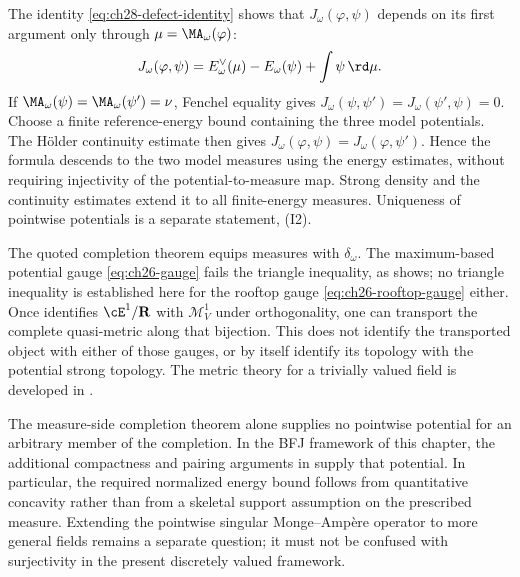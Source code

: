 \begin{remark}
\label{rem:ch28-quasimetric-well-defined}
The identity \eqref{eq:ch28-defect-identity} shows that
$J_\omega(\varphi,\psi)$ depends on its first argument only through
$\mu=\MA_\omega(\varphi)$:
\[
 J_\omega(\varphi,\psi)
   =E^\vee_\omega(\mu)-E_\omega(\psi)+\int\psi\,\rd\mu.
\]
If $\MA_\omega(\psi)=\MA_\omega(\psi')=\nu$, Fenchel equality gives
$J_\omega(\psi,\psi')=J_\omega(\psi',\psi)=0$.  Choose a finite
reference-energy bound containing the three model potentials.  The
H\"older continuity estimate
\cite[Theorem~1.33, equation~(1.38)]{BJ25FiniteEnergy} then gives
$J_\omega(\varphi,\psi)=J_\omega(\varphi,\psi')$.  Hence the formula
descends to the two model measures using the energy estimates, without
requiring injectivity of the potential-to-measure map.  Strong density
and the continuity estimates extend it to all finite-energy measures.
Uniqueness of pointwise potentials is a separate statement,
\textup{(I2)}.
\end{remark}

\begin{remark}
\label{rem:ch28-not-a-metric-on-potentials}
The quoted completion theorem equips measures with $\delta_\omega$.
The maximum-based potential gauge \eqref{eq:ch26-gauge} fails the
triangle inequality, as  shows; no triangle
inequality is established here for the rooftop gauge
\eqref{eq:ch26-rooftop-gauge} either.  Once
 identifies
$\cE^1/\mathbf R$ with $\mathcal M^1_V$ under orthogonality, one can
transport the complete quasi-metric along that bijection.  This does
not identify the transported object with either of those gauges, or
by itself identify its topology with the potential strong topology.
The metric theory for a trivially valued field is developed in
.
\end{remark}

\begin{remark}
\label{rem:ch28-completion-not-surjectivity}
The measure-side completion theorem alone supplies no pointwise
potential for an arbitrary member of the completion.  In the BFJ
framework of this chapter, the additional compactness and pairing
arguments in  supply that
potential.  In particular, the required normalized energy bound follows
from quantitative concavity rather than from a skeletal support
assumption on the prescribed measure.  Extending the pointwise singular
Monge--Amp\`ere operator to more general fields remains a separate
question; it must not be confused with surjectivity in the present
discretely valued framework.
\end{remark}


